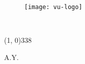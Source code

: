 \frontmatter
\begin{titlepage}

\begin{center}

\begin{LARGE}
\textbf{\myUni}\\
\end{LARGE}

\vspace{10pt}

\begin{Large}
\textsc{\myDepartment}\\
\end{Large}

\vspace{10pt}

\begin{large}	
\textsc{\myFaculty}\\
\end{large}

\vspace{70pt}
\begin{figure}[htbp]
\begin{center}
\texttt{[image: vu-logo]}
\end{center}
\end{figure}
\vspace{70pt}

\begin{LARGE}
\begin{center}
\textbf{\myTitle}\\
\end{center}
\end{LARGE}

\vspace{270pt}

\line(1, 0){338} \\
\begin{normalsize}
\textsc{A.Y. \myAA}
\end{normalsize}

\end{center}
\end{titlepage}
